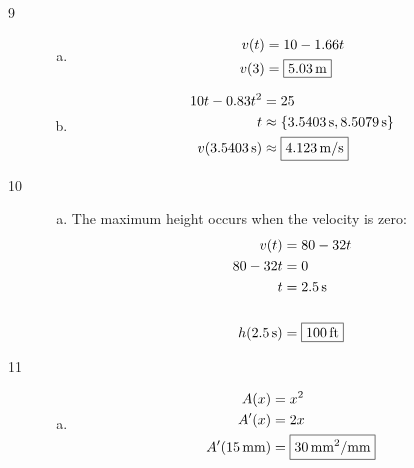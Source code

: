 \documentclass[letterpaper, landscape]{exam}
\begin{document}
\begin{description}
\begin{enumerate}[(a)]
      \end{enumerate}


    \item[9]
      \begin{enumerate}[(a)]
        \item 
          \begin{align*}
            v(t) & = 10 - 1.66t \\
            v(3) & = \boxed{ \unit[5.03]{m} } \\
          \end{align*}

        \item
          \begin{align*}
            10 t - 0.83 t^2     & = 25 \\
            t                   & \approx \{ \unit[3.5403]{s}, \unit[8.5079]{s} \}
            \\
            v(\unit[3.5403]{s}) & \approx \boxed{ \unit[4.123]{m/s} }
          \end{align*}

      \end{enumerate}
      
    \item[10]
      \begin{enumerate}[(a)]
        \item 
          The maximum height occurs when the velocity is zero:
          \begin{align*}
            v(t)             & = 80 - 32t \\
            80 - 32t         & = 0 \\
            t                & = \unit[2.5]{s} \\
            \\
            h(\unit[2.5]{s}) & = \boxed{ \unit[100]{ft} } \\
          \end{align*}

      \end{enumerate}

    \item[11]
      \begin{enumerate}[(a)]
        \item 
          \begin{align*}
            A(x)              & = x^2 \\
            A'(x)             & = 2x \\
            A'(\unit[15]{mm}) & = \boxed{ \unit[30]{mm^2/mm} } \\
          \end{align*}


\end{enumerate}
\end{description}
\end{document}
